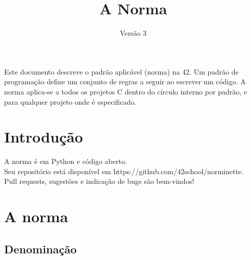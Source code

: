 \documentclass{42-pt}
\begin{document}
\title{A Norma}
\subtitle{Versão 3}

\summary
{
    Este documento descreve o padrão aplicável (norma) na 42. Um padrão de
	programação define um conjunto de regras a seguir ao escrever um código.
    A norma aplica-se a todos os projetos C dentro do círculo interno por padrão, e
    para qualquer projeto onde é especificado.
}

\maketitle

\tableofcontents



\chapter{Introdução}

    A norma é em Python e código aberto.\\
    Seu repositório está disponível em https://github.com/42school/norminette. \\
    Pull requests, sugestões e indicação de bugs são bem-vindos!

\chapter{A norma}


    \section{Denominação}
\end{document}
